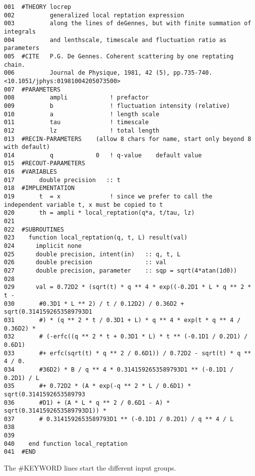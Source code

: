 \documentclass{article}
\begin{document}
\small
\begin{verbatim}
001  #THEORY locrep
002          generalized local reptation expression
003          along the lines of deGennes, but with finite summation of integrals
004          and lenthscale, timescale and fluctuation ratio as parameters
005  #CITE   P.G. De Gennes. Coherent scattering by one reptating chain. 
006          Journal de Physique, 1981, 42 (5), pp.735-740. <10.1051/jphys:01981004205073500>     
007  #PARAMETERS
008          ampli            ! prefactor 
009          b                ! fluctuation intensity (relative)
010          a                ! length scale
011          tau              ! timescale
012          lz               ! total length
013  #RECIN-PARAMETERS    (allow 8 chars for name, start only beyond 8 with default)
014          q            0   ! q-value    default value
015  #RECOUT-PARAMETERS
016  #VARIABLES
017       double precision   :: t
018  #IMPLEMENTATION
019       t  = x              ! since we prefer to call the independent variable t, x must be copied to t
020       th = ampli * local_reptation(q*a, t/tau, lz)
021  
022  #SUBROUTINES
023    function local_reptation(q, t, L) result(val)
024      implicit none
025      double precision, intent(in)   :: q, t, L
026      double precision               :: val
027      double precision, parameter    :: sqp = sqrt(4*atan(1d0))
028  
029      val = 0.72D2 * (sqrt(t) * q ** 4 * exp((-0.2D1 * L * q ** 2 * t - 
030       #0.3D1 * L ** 2) / t / 0.12D2) / 0.36D2 + sqrt(0.3141592653589793D1
031       #) * (q ** 2 * t / 0.3D1 + L) * q ** 4 * exp(t * q ** 4 / 0.36D2) *
032       # (-erfc((q ** 2 * t + 0.3D1 * L) * t ** (-0.1D1 / 0.2D1) / 0.6D1) 
033       #+ erfc(sqrt(t) * q ** 2 / 0.6D1)) / 0.72D2 - sqrt(t) * q ** 4 / 0.
034       #36D2) * B / q ** 4 * 0.3141592653589793D1 ** (-0.1D1 / 0.2D1) / L 
035       #+ 0.72D2 * (A * exp(-q ** 2 * L / 0.6D1) * sqrt(0.3141592653589793
036       #D1) + (A * L * q ** 2 / 0.6D1 - A) * sqrt(0.3141592653589793D1)) *
037       # 0.3141592653589793D1 ** (-0.1D1 / 0.2D1) / q ** 4 / L
038  
039  
040    end function local_reptation
041  #END

\end{verbatim}
\normalsize

The \#KEYWORD lines start the different input groups.
\end{document}
